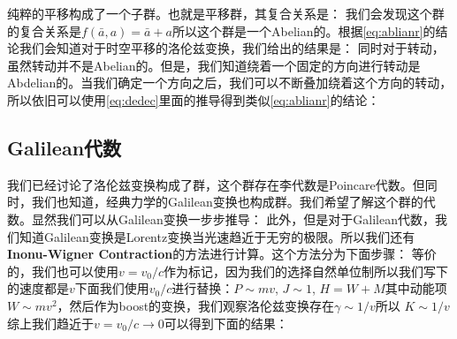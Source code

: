 纯粹的平移构成了一个子群。也就是平移群，其复合关系是：
我们会发现这个群的复合关系是$ f(\bar{a},a) = \bar{a}+a $所以这个群是一个Abelian的。根据\cref{eq:ablianr}的结论我们会知道对于时空平移的洛伦兹变换，我们给出的结果是：
同时对于转动，虽然转动并不是Abelian的。但是，我们知道绕着一个固定的方向进行转动是Abdelian的。当我们确定一个方向之后，我们可以不断叠加绕着这个方向的转动，所以依旧可以使用\cref{eq:dedec}里面的推导得到类似\cref{eq:ablianr}的结论：

\subsection{Galilean代数}
我们已经讨论了洛伦兹变换构成了群，这个群存在李代数是Poincare代数。但同时，我们也知道，经典力学的Galilean变换也构成群。我们希望了解这个群的代数。显然我们可以从Galilean变换一步步推导：
此外，但是对于Galilean代数，我们知道Galilean变换是Lorentz变换当光速趋近于无穷的极限。所以我们还有\textbf{Inonu-Wigner Contraction}的方法进行计算。这个方法分为下面步骤：
等价的，我们也可以使用$ v = v_0/c $作为标记，因为我们的选择自然单位制所以我们写下的速度都是$ v $下面我们使用$ v_0/c $进行替换：$  P \sim mv $, $ J \sim 1 $, $ H = W+M $其中动能项$ W \sim mv^2 $，然后作为boost的变换，我们观察洛伦兹变换存在$ \gamma \sim 1/v $所以 $ K\sim 1/v $综上我们趋近于$ v = v_0/c \to 0 $可以得到下面的结果：
